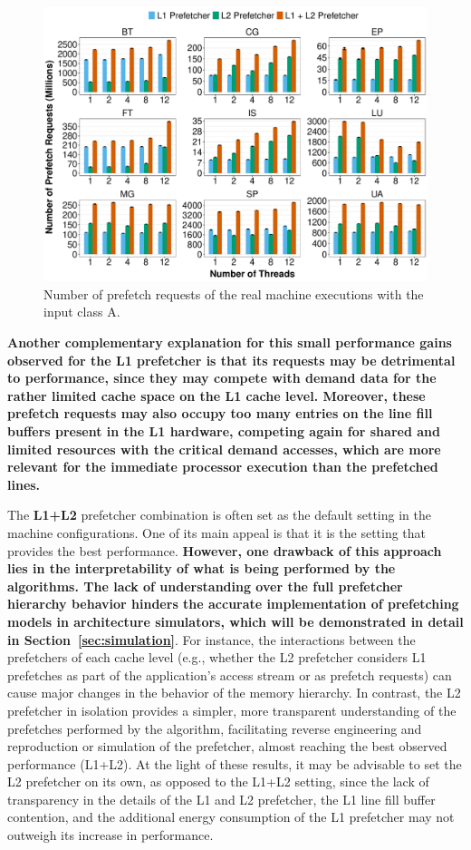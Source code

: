\documentclass[AMA,final,STIX1COL]{WileyNJD-v2}
\newcommand\new[1]{{\color{red}\textbf{#1}}}
\begin{document}
\begin{figure}[!htb]
    \centering
    \includegraphics[width=\linewidth]{figures/prefetch-requests-real.pdf}
    \caption{Number of prefetch requests of the real machine executions with the input class A.}
    \label{fig:real_l2-rqsts-all-pf}
\end{figure}

\new{Another complementary explanation for this small performance gains observed for the L1 prefetcher is that its requests may be detrimental to performance, since they may compete with demand data for the rather limited cache space on the L1 cache level.
Moreover, these prefetch requests may also occupy too many entries on the line fill buffers present in the L1 hardware, competing again for shared and limited resources with the critical demand accesses, which are more relevant for the immediate processor execution than the prefetched lines.}


The \new{L1+L2} prefetcher combination is often set as the default setting in the machine configurations.
One of its main appeal is that it is the setting that provides the best performance. 
\new{However, one drawback of this approach lies in the interpretability of what is being performed by the algorithms.
The lack of understanding over the full prefetcher hierarchy behavior hinders the accurate implementation of prefetching models in architecture simulators, which will be demonstrated in detail in Section~\ref{sec:simulation}}.
For instance, the interactions between the prefetchers of each cache level (e.g., whether the L2 prefetcher considers L1 prefetches as part of the application's access stream or as prefetch requests) can cause major changes in the behavior of the memory hierarchy.
In contrast, the L2 prefetcher in isolation provides a simpler, more transparent understanding of the prefetches performed by the algorithm, facilitating reverse engineering and reproduction or simulation of the prefetcher, almost reaching the best observed performance (L1+L2).
At the light of these results, it may be advisable to set the L2 prefetcher on its own, as opposed to the L1+L2 setting, since the lack of transparency in the details of the L1 and L2 prefetcher, the L1 line fill buffer contention, and the additional energy consumption of the L1 prefetcher may not outweigh its increase in performance.
\end{document}

